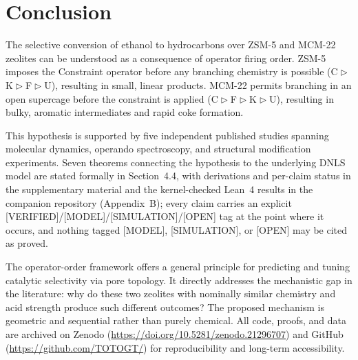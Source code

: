 \documentclass[11pt]{article}
\newcommand{\comp}{\mathrel{\triangleright}} %
\begin{document}
\section{Conclusion}

The selective conversion of ethanol to hydrocarbons over ZSM-5 and MCM-22 zeolites can be understood as a consequence of operator firing order. ZSM-5 imposes the Constraint operator before any branching chemistry is possible (C$\comp$K$\comp$F$\comp$U), resulting in small, linear products. MCM-22 permits branching in an open supercage before the constraint is applied (C$\comp$F$\comp$K$\comp$U), resulting in bulky, aromatic intermediates and rapid coke formation.

This hypothesis is supported by five independent published studies spanning molecular dynamics, operando spectroscopy, and structural modification experiments. Seven theorems connecting the hypothesis to the underlying DNLS model are stated formally in Section~4.4, with derivations and per-claim status in the supplementary material and the kernel-checked Lean~4 results in the companion repository (Appendix~B); every claim carries an explicit [VERIFIED]/[MODEL]/[SIMULATION]/[OPEN] tag at the point where it occurs, and nothing tagged [MODEL], [SIMULATION], or [OPEN] may be cited as proved.

The operator-order framework offers a general principle for predicting and tuning catalytic selectivity via pore topology. It directly addresses the mechanistic gap in the literature: why do these two zeolites with nominally similar chemistry and acid strength produce such different outcomes? The proposed mechanism is geometric and sequential rather than purely chemical. All code, proofs, and data are archived on Zenodo (\url{https://doi.org/10.5281/zenodo.21296707}) and GitHub (\url{https://github.com/TOTOGT/}) for reproducibility and long-term accessibility.
\end{document}
